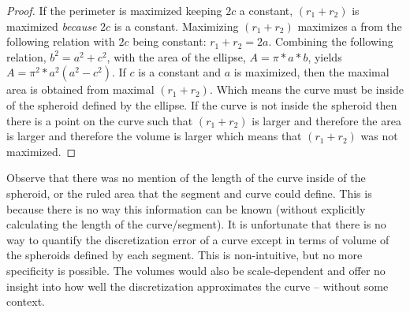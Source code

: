 \begin{proof}
If the perimeter is maximized keeping $2c$ a constant, $(r_1 + r_2)$ is 
maximized \textit{because} $2c$ is a constant.  Maximizing $(r_1+r_2)$ 
maximizes a from the following relation with $2c$ being constant: $r_1 + 
r_2 = 2a$.  Combining the following relation, $b^2 = a^2 + c^2$, with the 
area of the ellipse, $A = \pi * a * b$, yields $A=\pi^{2}*a^{2}(a^{2} - 
c^2)$.  If $c$ is a constant and $a$ is maximized, then the maximal area 
is obtained from maximal $(r_1+r_2)$.  Which means the curve must be 
inside of the spheroid defined by the ellipse.  If the curve is not inside 
the spheroid then there is a point on the curve such that $(r_1+r_2)$ is 
larger and therefore the area is larger and therefore the volume is larger 
which means that $(r_1+r_2)$ was not maximized.
\end{proof}

Observe that there was no mention of the length of the curve inside of the 
spheroid, or the ruled area that the segment and curve could define.  
This is because there is no way this information can be known (without 
explicitly calculating the length of the curve/segment).  It is 
unfortunate that there is no way to quantify the discretization error of a 
curve except in terms of volume of the spheroids defined by each segment.  
This is non-intuitive, but no more specificity is possible.  The volumes 
would also be scale-dependent and offer no insight into how well the 
discretization approximates the curve -- without some context.
